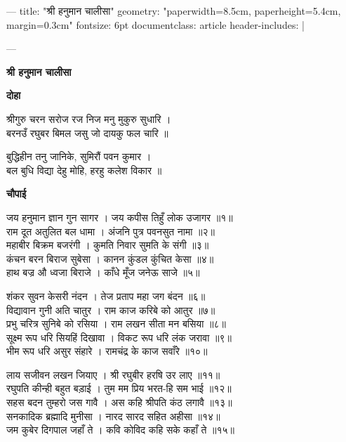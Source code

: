 ---
title: "श्री हनुमान चालीसा"
geometry: "paperwidth=8.5cm, paperheight=5.4cm, margin=0.3cm"
fontsize: 6pt
documentclass: article
header-includes: |
  \usepackage[utf8]{inputenc}
  \usepackage{xcolor}
  \usepackage{fancyhdr}
  \pagestyle{fancy}
  \fancyhf{}
  \renewcommand{\headrulewidth}{0pt}
  \setlength{\parindent}{0pt}
  \setlength{\parskip}{1pt}
---

\begin{center}
{\Large \textbf{श्री हनुमान चालीसा}}
\end{center}

\vspace{2mm}

\textbf{दोहा}

श्रीगुरु चरन सरोज रज निज मनु मुकुरु सुधारि ।\\
बरनउँ रघुबर बिमल जसु जो दायकु फल चारि ॥

बुद्धिहीन तनु जानिके, सुमिरौं पवन कुमार ।\\
बल बुधि विद्या देहु मोहि, हरहु कलेश विकार ॥

\vspace{1mm}

\textbf{चौपाई}

जय हनुमान ज्ञान गुन सागर । जय कपीस तिहुँ लोक उजागर ॥१॥\\
राम दूत अतुलित बल धामा । अंजनि पुत्र पवनसुत नामा ॥२॥\\
महाबीर बिक्रम बजरंगी । कुमति निवार सुमति के संगी ॥३॥\\
कंचन बरन बिराज सुबेसा । कानन कुंडल कुंचित केसा ॥४॥\\
हाथ बज्र औ ध्वजा बिराजे । काँधे मूँज जनेऊ साजे ॥५॥

शंकर सुवन केसरी नंदन । तेज प्रताप महा जग बंदन ॥६॥\\
विद्यावान गुनी अति चातुर । राम काज करिबे को आतुर ॥७॥\\
प्रभु चरित्र सुनिबे को रसिया । राम लखन सीता मन बसिया ॥८॥\\
सूक्ष्म रूप धरि सियहिं दिखावा । विकट रूप धरि लंक जरावा ॥९॥\\
भीम रूप धरि असुर संहारे । रामचंद्र के काज सवाँरे ॥१०॥

लाय सजीवन लखन जियाए । श्री रघुबीर हरषि उर लाए ॥११॥\\
रघुपति कीन्ही बहुत बड़ाई । तुम मम प्रिय भरत-हि सम भाई ॥१२॥\\
सहस बदन तुम्हरो जस गावै । अस कहि श्रीपति कंठ लगावै ॥१३॥\\
सनकादिक ब्रह्मादि मुनीसा । नारद सारद सहित अहीसा ॥१४॥\\
जम कुबेर दिगपाल जहाँ ते । कवि कोविद कहि सके कहाँ ते ॥१५॥

